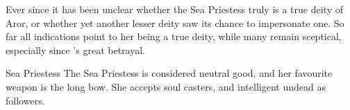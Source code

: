 Ever since it has been unclear whether the Sea Priestess truly is a true deity
of Aror, or whether yet another lesser deity saw its chance to impersonate
one. So far all indications point to her being a true deity, while many remain
sceptical, especially since 's great betrayal.

\begin{35e}{Sea Priestess}
  The Sea Priestess is considered neutral good, and her favourite weapon is
  the long bow. She accepts soul casters, and intelligent undead as followers.
\end{35e}
